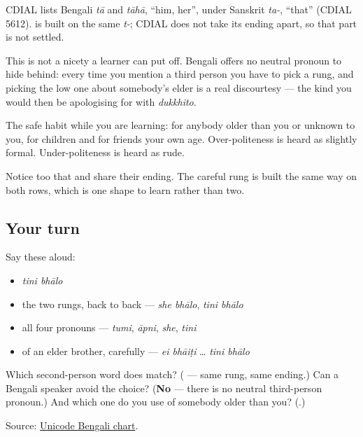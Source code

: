 \begin{cousinweb}
CDIAL lists Bengali \emph{tā} and \emph{tāhā}, \textquotedblleft{}him, her\textquotedblright{}, under Sanskrit \emph{ta-}, \textquotedblleft{}that\textquotedblright{} (CDIAL 5612). \textbf{} is built on the same \emph{t-}; CDIAL does not take its ending apart, so that part is not settled.
\end{cousinweb}

\begin{grammarlens}[title={Grammar Lens: the cost of getting it wrong}]
This is not a nicety a learner can put off. Bengali offers no neutral pronoun to hide behind: every time you mention a third person you have to pick a rung, and picking the low one about somebody's elder is a real discourtesy — the kind you would then be apologising for with \emph{dukkhito}.

The safe habit while you are learning: \textbf{} for anybody older than you or unknown to you, \textbf{} for children and for friends your own age. Over-politeness is heard as slightly formal. Under-politeness is heard as rude.

Notice too that \textbf{} and \textbf{} share their ending. The careful rung is built the same way on both rows, which is one shape to learn rather than two.
\end{grammarlens}

\subsection*{Your turn}
Say these aloud:

\begin{itemize}
\raggedright
  \item \emph{tini bhālo}
  \item the two rungs, back to back — \emph{she bhālo}, \emph{tini bhālo}
  \item all four pronouns — \emph{tumi}, \emph{āpni}, \emph{she}, \emph{tini}
  \item of an elder brother, carefully — \emph{ei bhāiṭi} … \emph{tini bhālo}
\end{itemize}

\begin{tcolorbox}[breakable,colback=teal!4,colframe=teal!35!black,title={Before you move on}]
Which second-person word does \textbf{} match? (\textbf{} — same rung, same ending.) Can a Bengali speaker avoid the choice? (\textbf{No} — there is no neutral third-person pronoun.) And which one do you use of somebody older than you? (\textbf{}.)

Source: \href{https://www.unicode.org/charts/PDF/U0980.pdf}{Unicode Bengali chart}.
\end{tcolorbox}
